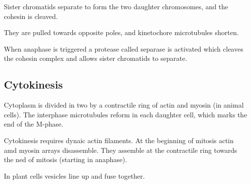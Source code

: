 \documentclass[11pt]{scrartcl}
\begin{document}
Sister chromatids separate to form the two daughter chromosomes, and
the cohesin is cleaved.

They are pulled towards opposite poles, and kinetochore microtubules
shorten.

When anaphase is triggered a protease called separase is activated
which cleaves the cohesin complex and allows sister chromatids to
separate.

\subsection{Cytokinesis}

Cytoplasm is divided in two by a contractile ring of actin and myosin
(in animal cells). The interphase microtubules reform in each daughter
cell, which marks the end of the M-phase.

Cytokinesis requires dynaic actin filaments. At the beginning of
mitosis actin amd myosin arrays disassemble. They assemble at the
contractile ring towards the ned of mitosis (starting in anaphase).

In plant cells vesicles line up and fuse together.
\end{document}
